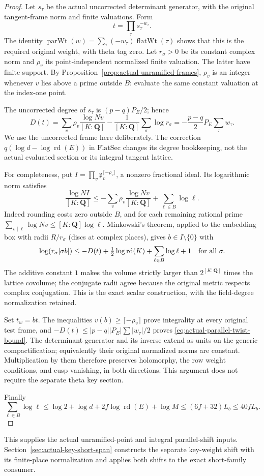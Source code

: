 \begin{proof}
Let $s_\tau$ be the actual uncorrected determinant generator,
with the original tangent-frame norm and finite valuations.  Form
\[
                       t=\prod_\tau s_\tau^{-w_\tau}.
\]
The identity $\operatorname{parWt}(w)=
\sum_\tau(-w_\tau)\operatorname{flatWt}(\tau)$ shows that this
is the required original weight, with theta tag zero.
Let $r_\sigma>0$ be its constant complex norm and $\rho_v$ its
point-independent normalized finite valuation.  The latter have
finite support.  By Proposition~\ref{prop:actual-unramified-frames},
$\rho_v$ is an integer whenever $v$ lies above a prime outside $B$:
evaluate the same constant valuation at the index-one point.

The uncorrected degree of $s_\tau$ is $(p-q)P_E/2$; hence
\[
 D(t)=\sum_v\rho_v\frac{\log N v}{[K:\mathbf Q]}
         -\frac{1}{[K:\mathbf Q]}\sum_\sigma\log r_\sigma
       =-\frac{p-q}{2}P_E\sum_\tau w_\tau.
\]
We use the uncorrected frame here deliberately.  The correction
$q(\log d-\log\operatorname{rd}(E))$ in
$\mathrm{FlatSec}$ changes its degree bookkeeping, not the
actual evaluated section or its integral tangent lattice.

For completeness, put
$I=\prod_v\mathfrak p_v^{\lceil-\rho_v\rceil}$, a nonzero
fractional ideal.  Its logarithmic norm satisfies
\[
 \frac{\log N I}{[K:\mathbf Q]}
 \le-\sum_v\rho_v\frac{\log N v}{[K:\mathbf Q]}
                     +\sum_{\ell\in B}\log\ell.
\]
Indeed rounding costs zero outside $B$, and for each remaining
rational prime
$\sum_{v\mid\ell}\log N v\le[K:\mathbf Q]\log\ell$.
Minkowski's theorem, applied to the embedding box with radii
$R/r_\sigma$ (discs at complex places), gives $b\in I\setminus\{0\}$
with
\[
 \log(r_\sigma|\sigma b|)
 \le -D(t)+\tfrac12\log\operatorname{rd}(K)
                 +\sum_{\ell\in B}\log\ell+1
 \quad\hbox{for all }\sigma.
\]
The additive constant $1$ makes the volume strictly larger than
$2^{[K:\mathbf Q]}$ times the lattice covolume; the conjugate
radii agree because the original metric respects complex
conjugation.  This is the exact scalar construction, with the
field-degree normalization retained.

Set $t_w=bt$.  The inequalities
$v(b)\ge\lceil-\rho_v\rceil$ prove integrality at every original
test frame, and $-D(t)\le |p-q||P_E|\sum|w_\tau|/2$ proves
\eqref{eq:actual-parallel-twist-bound}.  The determinant generator
and its inverse extend as units on the generic compactification;
equivalently their original normalized norms are constant.
Multiplication by them therefore preserves holomorphy, the row
weight conditions, and cusp vanishing, in both directions.  This
argument does not require the separate theta key section.

Finally
\[
 \sum_{\ell\in B}\log\ell
 \le\log2+\log d+2f\log\operatorname{rd}(E)+\log M
 \le(6f+32)L_b\le40fL_b.
\]
\end{proof}

This supplies the actual unramified-point and integral parallel-shift
inputs.  Section~\ref{sec:actual-key-short-span} constructs the separate
key-weight shift with its finite-place normalization and applies both
shifts to the exact short-family consumer.
